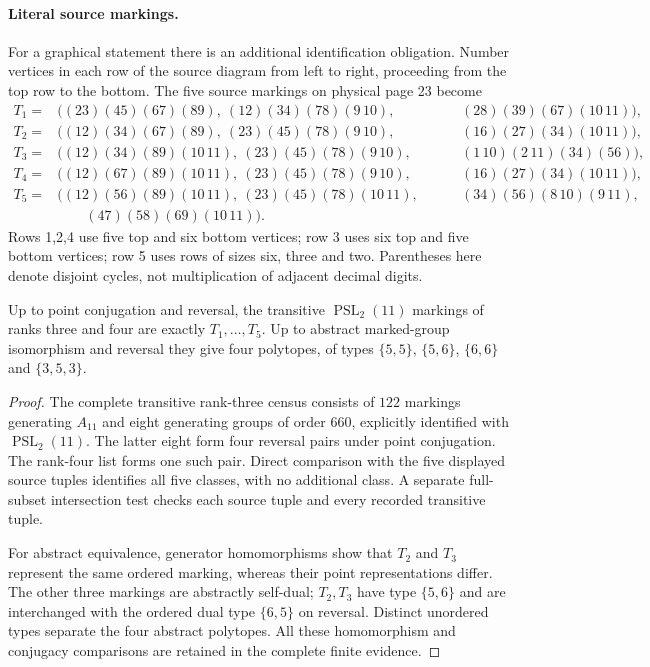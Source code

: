 \documentclass[11pt,a4paper]{article}
\begin{document}
\paragraph{Literal source markings.}
For a graphical statement there is an additional identification
obligation. Number vertices in each row of the source diagram
from left to right, proceeding from the top row to the bottom.
The five source markings on physical page 23 become
\begin{align*}
T_1={}&((23)(45)(67)(89),\ (12)(34)(78)(9\,10),\
 &\qquad (28)(39)(67)(10\,11)),\\
T_2={}&((12)(34)(67)(89),\ (23)(45)(78)(9\,10),\
 &\qquad (16)(27)(34)(10\,11)),\\
T_3={}&((12)(34)(89)(10\,11),\ (23)(45)(78)(9\,10),\
 &\qquad (1\,10)(2\,11)(34)(56)),\\
T_4={}&((12)(67)(89)(10\,11),\ (23)(45)(78)(9\,10),\
 &\qquad (16)(27)(34)(10\,11)),\\
T_5={}&((12)(56)(89)(10\,11),\ (23)(45)(78)(10\,11),\
 &\qquad (34)(56)(8\,10)(9\,11),\\
 &\qquad (47)(58)(69)(10\,11)).
\end{align*}
Rows 1,2,4 use five top and six bottom vertices; row 3 uses
six top and five bottom vertices; row 5 uses rows of sizes
six, three and two. Parentheses here denote disjoint cycles,
not multiplication of adjacent decimal digits.

\begin{proposition}[The source permutation list]
Up to point conjugation and reversal, the transitive
$\operatorname{PSL}_2(11)$ markings of ranks three and four
are exactly $T_1,\ldots,T_5$. Up to abstract marked-group
isomorphism and reversal they give four polytopes, of types
$\{5,5\}$, $\{5,6\}$, $\{6,6\}$ and $\{3,5,3\}$.
\end{proposition}
\begin{proof}
The complete transitive rank-three census consists of $122$
markings generating $A_{11}$ and eight generating groups of
order $660$, explicitly identified with $\operatorname{PSL}_2(11)$.
The latter eight form four reversal pairs under point conjugation.
The rank-four list forms one such pair. Direct comparison with
the five displayed source tuples identifies all five classes,
with no additional class. A separate full-subset intersection
test checks each source tuple and every recorded transitive tuple.

For abstract equivalence, generator homomorphisms show that
$T_2$ and $T_3$ represent the same ordered marking, whereas
their point representations differ. The other three markings
are abstractly self-dual; $T_2,T_3$ have type $\{5,6\}$ and
are interchanged with the ordered dual type $\{6,5\}$ on
reversal. Distinct unordered types separate the four abstract
polytopes. All these homomorphism and conjugacy comparisons
are retained in the complete finite evidence.
\end{proof}
\end{document}
